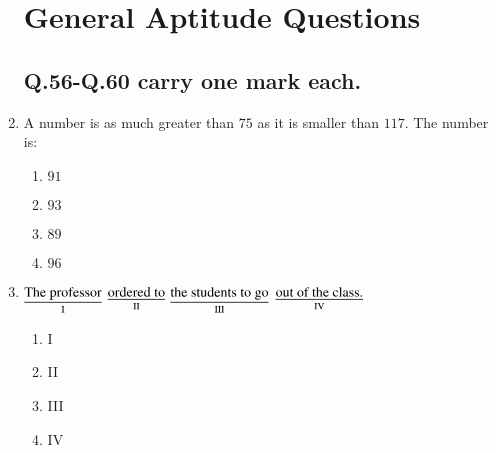 \documentclass[journal]{IEEEtran}
\begin{document}
\begin{enumerate}
    \section{\textbf{General Aptitude  Questions}}
    \subsection{\textbf{Q.56-Q.60 carry one mark each.}}
    \item A number is as much greater than $75$ as it is smaller than $117$. The number is:
    \begin{multicols}{4}
    \begin{enumerate}
        \item $91$
        \item $93$
        \item $89$
        \item $96$\\
    \end{enumerate}
        
    \end{multicols}
\item $\underset{\text{I}}{\text{\underline{The professor}}}$ $\underset{\text{II}}{\text{\underline{ordered to}}}$ $\underset{\text{III}}{\text{\underline{the students to go}}}$ $\underset{\text{IV}}{\text{\underline{out of the class.}}}$

\begin{multicols}{4}
\begin{enumerate}
    \item I
    \item II
    \item III
    \item IV
\end{enumerate}
    

\end{multicols}
\end{enumerate}
\end{document}
